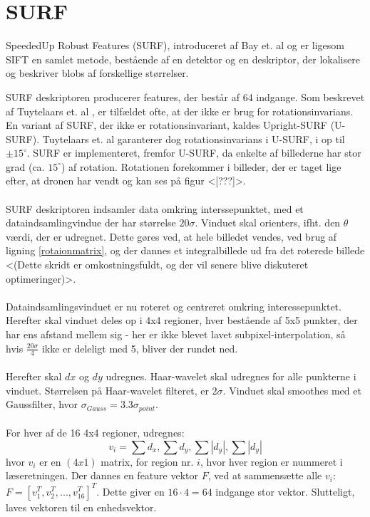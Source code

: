 \section{SURF}
SpeededUp Robust Features (SURF), introduceret af Bay et. al \cite{SURF} og er ligesom SIFT en samlet metode, bestående af en detektor og en deskriptor, der lokalisere og beskriver blobs af forskellige størrelser.


SURF deskriptoren producerer features, der består af 64 indgange. Som beskrevet af Tuytelaars et. al \cite{SURF}, er tilfældet ofte, at der ikke er brug for rotationsinvarians. En variant af SURF, der ikke er rotationsinvariant, kaldes Upright-SURF (U-SURF). Tuytelaars et. al garanterer dog rotationsinvarians i U-SURF, i op til $\pm 15^{\circ}$. SURF er implementeret, fremfor U-SURF, da enkelte af billederne har stor grad (ca. $15^{\circ}$) af rotation. Rotationen forekommer i billeder, der er taget lige efter, at dronen har vendt og kan ses på figur <[???]>.
\\
\\
SURF deskriptoren indsamler data omkring interssepunktet, med et dataindsamlingvindue der har størrelse $20 \sigma$. Vinduet skal orienters, ifht. den $\theta$ værdi, der er udregnet. Dette gøres ved, at hele billedet vendes, ved brug af ligning \eqref{rotaionmatrix}, og der dannes et integralbillede ud fra det roterede billede <(Dette skridt er omkostningsfuldt, og der vil senere blive diskuteret optimeringer)>.
\\
\\
Dataindsamlingsvinduet er nu roteret og centreret omkring interessepunktet. Herefter skal vinduet deles op i 4x4 regioner, hver bestående af 5x5 punkter, der har ens afstand mellem sig - her er ikke blevet lavet subpixel-interpolation, så hvis $\frac{20\sigma}{4}$ ikke er deleligt med 5, bliver der rundet ned.
\\
\\
Herefter skal $dx$ og $dy$ udregnes. Haar-wavelet skal udregnes for alle punkterne i vinduet. Størrelsen på Haar-wavelet filteret, er $2\sigma$. Vinduet skal smoothes med et Gaussfilter, hvor $\sigma_{Gauss} = 3.3\sigma_{point}$.
\\
\\
For hver af de 16 4x4 regioner, udregnes: 
\begin{equation}
v_i = \sum d_x, \sum d_y, \sum |d_y|, \sum |d_y|
\label{surffeature}
\end{equation}
hvor $v_i$ er en $(4x1)$ matrix, for region nr. $i$, hvor hver region er nummeret i læseretningen. Der dannes en feature vektor $F$, ved at sammensætte alle $v_i$: $F = [v_1^T, v_2^T,..., v_16^T]^T$. Dette giver en $16 \cdot 4 = 64$ indgange stor vektor. Slutteligt, laves vektoren til en enhedsvektor.

